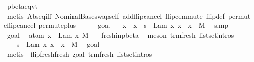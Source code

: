\begin{isabellebody}
\ pbeta{\isachardot}eqvt\ \isamarkupfalse%
\ {\isacharparenleft}metis\ Abs{}{\isacharunderscore}eq{\isacharunderscore}iff{\isacharparenleft}{}{\isacharparenright}\ Nominal{}{\isacharunderscore}Base{\isachardot}swap{\isacharunderscore}self\ add{\isacharunderscore}flip{\isacharunderscore}cancel\ flip{\isacharunderscore}commute\ flip{\isacharunderscore}def\ permute{\isacharunderscore}flip{\isacharunderscore}cancel{}\ permute{\isacharunderscore}plus{\isacharparenright}\isanewline
\ \ \ \ \isamarkupfalse%
\ goal{}\ \isamarkupfalse%
\ {}{\isacharcolon}\ {\isachardoublequoteopen}{\isacharparenleft}x{\isacharprime}\ {\isasymleftrightarrow}\ x{\isacharparenright}\ {\isasymbullet}\ s{\isacharprime}\ {\isacharequal}\ Lam\ {\isacharbrackleft}x{\isacharbrackright}{\isachardot}\ {\isacharparenleft}{\isacharparenleft}x{\isacharprime}\ {\isasymleftrightarrow}\ x{\isacharparenright}\ {\isasymbullet}\ M{\isacharprime}{\isacharparenright}{\isachardoublequoteclose}\ \isamarkupfalse%
\ simp\isanewline
\ \ \ \ \isamarkupfalse%
\ goal{}\ \isamarkupfalse%
\ {\isachardoublequoteopen}atom\ x\ {\isasymsharp}\ {\isacharparenleft}Lam\ {\isacharbrackleft}x{\isacharprime}{\isacharbrackright}{\isachardot}\ M{\isacharprime}{\isacharparenright}{\isachardoublequoteclose}\ \ \isamarkupfalse%
\ fresh{\isacharunderscore}in{\isacharunderscore}pbeta\ \isamarkupfalse%
\ {\isacharparenleft}meson\ trm{\isachardot}fresh{\isacharparenleft}{}{\isacharparenright}\ list{\isachardot}set{\isacharunderscore}intros{\isacharparenleft}{}{\isacharparenright}{\isacharparenright}\isanewline
\ \ \ \ \isamarkupfalse%
\ {}\ \isamarkupfalse%
\ {\isachardoublequoteopen}s{\isacharprime}\ {\isacharequal}\ Lam\ {\isacharbrackleft}x{\isacharbrackright}{\isachardot}\ {\isacharparenleft}{\isacharparenleft}x{\isacharprime}\ {\isasymleftrightarrow}\ x{\isacharparenright}\ {\isasymbullet}\ M{\isacharprime}{\isacharparenright}{\isachardoublequoteclose}\ \isamarkupfalse%
\ goal{}\ \isamarkupfalse%
\ {\isacharparenleft}metis\ {\isachardoublequoteopen}{}{\isachardoublequoteclose}\ flip{\isacharunderscore}fresh{\isacharunderscore}fresh\ goal{}{\isacharparenleft}{}{\isacharparenright}\ trm{\isachardot}fresh{\isacharparenleft}{}{\isacharparenright}\ list{\isachardot}set{\isacharunderscore}intros{\isacharparenleft}{}{\isacharparenright}{\isacharparenright}\isanewline

\end{isabellebody}

